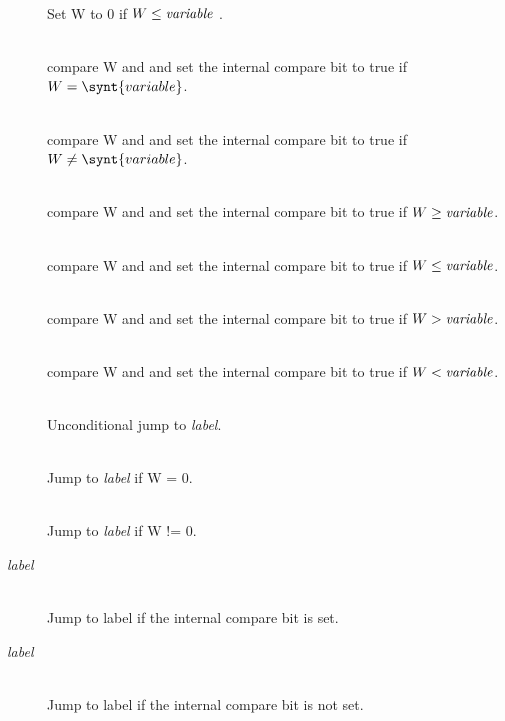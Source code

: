\documentclass[11pt]{scrartcl}
\begin{document}
\begin{addmargin}{1cm}
\begin{description}
\item[ ]  \hfill\\  
Set W to 0 if $W \le \text{{\it variable}}$ .

\item[ ]  \hfill\\  
compare W and  and set the internal compare bit to true if $W=\synt{variable}$.

\item[ ]  \hfill\\  
compare W and  and set the internal compare bit to true if $W\neq\synt{variable}$.

\item[ ]\hfill\\  
compare W and  and set the internal compare bit to true if $W \ge \text{\it variable}$.

\item[ ]\hfill\\  
compare W and  and set the internal compare bit to true if $W \le \text{\it variable}$.

\item[ ]\hfill\\  
compare W and  and set the internal compare bit to true if $W > \text{\it variable}$.

\item[ ]\hfill\\  
compare W and  and set the internal compare bit to true if $W < \text{\it variable}$.

\item[ ] \hfill\\   
Unconditional jump to {\it label}.

\item[ ]  \hfill\\  
Jump to {\it label} if W = 0.

\item[ ] \hfill\\   
Jump to {\it label} if W != 0.

\item[ {\it label}] \hfill\\   
Jump to label if the internal compare bit is set.

\item[ {\it label}] \hfill\\   
Jump to label if the internal compare bit is not set.
\end{description}
\end{addmargin}
\end{document}

